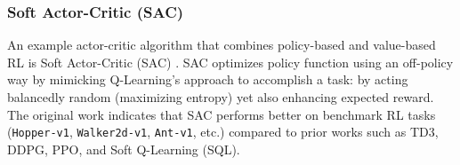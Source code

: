 \subsubsection{Soft Actor-Critic (SAC)}
An example actor-critic algorithm that combines policy-based and value-based RL is Soft Actor-Critic (SAC) \cite{RL100}. SAC optimizes policy function using an off-policy way by mimicking Q-Learning's approach to accomplish a task: by acting balancedly random (maximizing entropy) yet also enhancing expected reward. The original work \cite{RL100} indicates that SAC performs better on benchmark RL tasks (\texttt{Hopper-v1}, \texttt{Walker2d-v1}, \texttt{Ant-v1}, etc.) compared to prior works such as TD3, DDPG, PPO, and Soft Q-Learning (SQL).